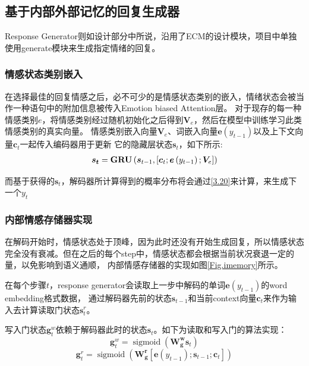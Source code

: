 \documentclass[supercite]{HustGraduPaper}
\theoremstyle{definition}
\begin{document}
\subsection{基于内部外部记忆的回复生成器}
Response Generator则如设计部分中所说，沿用了ECM\cite{DBLP:journals/corr/ZhouHZZL17}的设计模块，项目中单独使用generate模块来生成指定情绪的回复。

\subsubsection{情感状态类别嵌入}
在选择最佳的回复情感之后，必不可少的是情感状态类别的嵌入，情绪状态会被当作一种语句中的附加信息被传入Emotion biased Attention层。
对于现存的每一种情感类别$e$，将情感类别经过随机初始化之后得到$\boldsymbol{V}_e$，然后在模型中训练学习此类情感类别的真实向量。
情感类别嵌入向量$\boldsymbol{V}_e$、词嵌入向量$\boldsymbol{e}(y_{t-1})$以及上下文向量$\boldsymbol{c}_t$一起传入编码器用于更新
它的隐藏层状态$\boldsymbol{s}_t$，如下所示:
\begin{align}
  \boldsymbol { s } _ { \boldsymbol { t } } = \mathbf { G } \mathbf { R } \mathbf { U } \left( \boldsymbol { s } _ { t - 1 } , \left[ \boldsymbol { c } _ { t } ; \boldsymbol { e } \left( y _ { t - 1 } \right) ; \boldsymbol { V } _ { e } \right] \right) \notag
\end{align}

而基于获得的$\boldsymbol{s}_t$，解码器所计算得到的概率分布将会通过\ref{3.20}来计算，来生成下一个$y_t$

\subsubsection{内部情感存储器实现}
在解码开始时，情感状态处于顶峰，因为此时还没有开始生成回复，所以情感状态完全没有衰减。但在之后的每个step中，情感状态都会根据当前状况衰退一定的量，以免影响到语义通顺，
内部情感存储器的实现如图\ref{Fig.imemory}所示。

在每个步骤$t$，response generator会读取上一步中解码的单词$\boldsymbol{e}(y_{t-1})$的word embedding格式数据，
通过解码器先前的状态$\boldsymbol{s}_{t-1}$和当前context向量$\boldsymbol{c}_t$来作为输入去计算读取门状态${\boldsymbol{s}_t^r}$。

写入门状态$\boldsymbol{g}_t^w$依赖于解码器此时的状态$\boldsymbol{s}_t$。如下为读取和写入门的算法实现：
$$\boldsymbol { g } _ { t } ^ { w } = \operatorname { sigmoid } \left( \mathbf { W } _ { \mathbf { g } } ^ { \mathbf { w } } \boldsymbol { s } _ { t } \right)$$
$$\boldsymbol { g } _ { t } ^ { r } = \operatorname { sigmoid } \left( \mathbf { W } _ { \mathbf { g } } ^ { \mathbf { r } } \left[ \boldsymbol { e } \left( y _ { t - 1 } \right) ; \boldsymbol { s } _ { t - 1 } ; \boldsymbol { c } _ { t } \right] \right)$$
\end{document}
